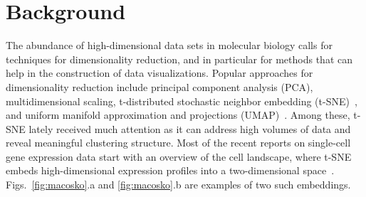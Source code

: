 \documentclass[twocolumn]{bmcart}
\begin{document}


\section*{Background}

The abundance of high-dimensional data sets in molecular biology calls for
techniques for dimensionality reduction, and in particular for methods that can
help in the construction of data visualizations. Popular approaches for
dimensionality reduction include principal component analysis (PCA), multidimensional
scaling, t-distributed stochastic
neighbor embedding (t-SNE)~\cite{maaten2008visualizing}, and uniform manifold approximation and
projections (UMAP)~\cite{2018arXivUMAP}. Among these, t-SNE lately received much
attention as it can address high volumes of data and reveal meaningful
clustering structure. Most of the recent reports on single-cell gene expression
data start with an overview of the cell landscape, where t-SNE embeds
high-dimensional expression profiles into a two-dimensional
space~\cite{macosko2015highly,cao2019single,tasic2018shared}.
Figs.~\ref{fig:macosko}.a and \ref{fig:macosko}.b are examples of two such
embeddings.
\end{document}
